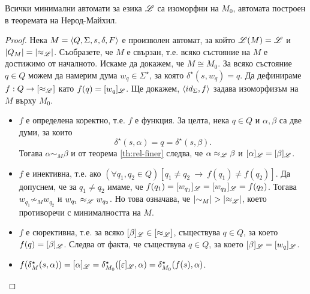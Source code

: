 \begin{cor}
  Всички минимални автомати за езика $\mathscr{L}$ са изоморфни на $M_0$, автомата построен в теоремата на Нерод-Майхил.
\end{cor}
\begin{proof}
  Нека $M = \langle{Q,\Sigma,s,\delta,F}\rangle$ е произволен автомат, за който $\mathscr{L}(M) = \mathscr{L}$ и $\vert{Q_M}\vert = \vert{\approx_{\mathscr{L}}}\vert$.
  Съобразете, че $M$ е свързан, т.е. всяко състояние на $M$ е достижимо от началното.
  Искаме да докажем, че $M \cong M_0$.
  За всяко състояние $q\in Q$ можем да намерим дума $w_q\in\Sigma^\star$,
  за която $\delta^\star(s,w_q) = q$.
  Да дефинираме $f:Q\to [\approx_{\mathscr{L}}]$ като $f(q) = [w_q]_{\mathscr{L}}$. Ще докажем, 
  $\langle{id_\Sigma, f}\rangle$ задава изоморфизъм на $M$ върху $M_0$.
  \begin{itemize}
  \item
    $f$ е определена коректно, т.е. $f$ е функция.
    За целта, нека $q\in Q$ и $\alpha,\beta$ са две думи, за които
    \[\delta^\star(s,\alpha) = q = \delta^\star(s,\beta).\]
    Тогава $\alpha\sim_M \beta$ и от теорема \ref{th:rel-finer} следва, 
    че $\alpha \approx_{\mathscr{L}} \beta$ и $[\alpha]_{\mathscr{L}} = [\beta]_{\mathscr{L}}$.
  \item
    $f$ е инективна, т.е. ако $(\forall q_1,q_2 \in Q)[q_1\neq q_2\ \rightarrow\ f(q_1) \neq f(q_2)]$.
    Да допуснем, че за $q_1 \neq q_2$ имаме, че $f(q_1) = [w_{q_1}]_{\mathscr{L}} = [w_{q_2}]_{\mathscr{L}} = f(q_2)$.
    Тогава $w_{q_1} \not\sim_M w_{q_2}$ и $w_{q_1} \approx_{\mathscr{L}} w_{q_2}$.
    Но това означава, че $\vert{\sim_M}\vert > \vert{\approx_{\mathscr{L}}}\vert$,
    което противоречи с минималността на $M$.
  \item
    $f$ е сюрективна, т.е. за всяко $[\beta]_{\mathscr{L}} \in [\approx_{\mathscr{L}}]$, съществува $q \in Q$, за което $f(q) = [\beta]_{\mathscr{L}}$.
    Следва от факта, че съществува $q \in Q$, за което $[\beta]_{\mathscr{L}} = [w_q]_{\mathscr{L}}$.
  \item
    $f(\delta^\star_M(s,\alpha)) = [\alpha]_{\mathscr{L}} = \delta^\star_{M_0}([\varepsilon]_{\mathscr{L}}, \alpha) = 
    \delta^\star_{M_0}(f(s), \alpha)$.
  \end{itemize}
\end{proof}


